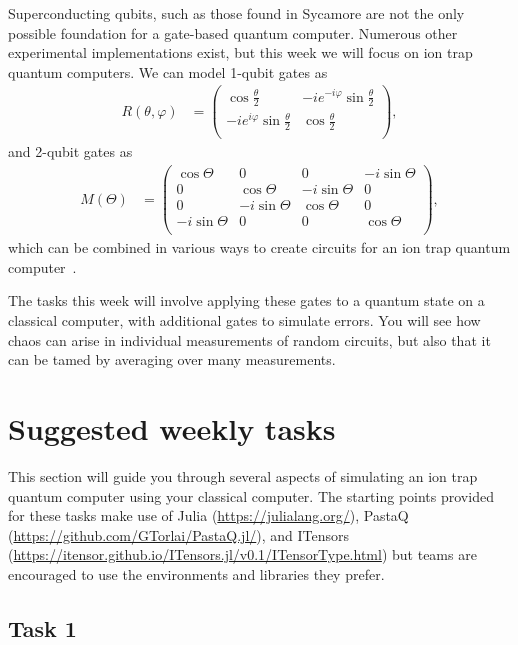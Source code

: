 \documentclass[12pt]{article}
\renewcommand{\phi}{\varphi}
\begin{document}
Superconducting qubits, such as those found in Sycamore are not the only possible foundation for a gate-based quantum computer.
Numerous other experimental implementations exist, but this week we will focus on ion trap quantum computers.
We can model 1-qubit gates as
\begin{align}
	R(\theta, \phi)
	&= \begin{pmatrix}
			\cos{\frac{\theta}{2}} & -i e^{-i \phi} \sin{\frac{\theta}{2}} \\
			-i e^{i \phi} \sin{\frac{\theta}{2}} & \cos{\frac{\theta}{2}} \\
		\end{pmatrix},
\end{align}
and 2-qubit gates as
\begin{align}
	M(\Theta)
	&= \begin{pmatrix}
			\cos{\Theta} & 0 & 0 & -i \sin{\Theta} \\
			0 & \cos{\Theta} & -i \sin{\Theta} & 0 \\
			0 & -i \sin{\Theta} & \cos{\Theta} & 0 \\
			-i \sin{\Theta} & 0 & 0 & \cos{\Theta} \\
		\end{pmatrix},
\end{align}
which can be combined in various ways to create circuits for an ion trap quantum computer~\cite{sorensen1999quantum,pogorelov2021compact}.

The tasks this week will involve applying these gates to a quantum state on a classical computer, with additional gates to simulate errors.
You will see how chaos can arise in individual measurements of random circuits, but also that it can be tamed by averaging over many measurements.


\section*{Suggested weekly tasks}

This section will guide you through several aspects of simulating an ion trap quantum computer using your classical computer.
The starting points provided for these tasks make use of Julia (\url{https://julialang.org/}), PastaQ (\url{https://github.com/GTorlai/PastaQ.jl/}), and ITensors (\url{https://itensor.github.io/ITensors.jl/v0.1/ITensorType.html}) but teams are encouraged to use the environments and libraries they prefer.


\subsection*{Task 1}
\end{document}
